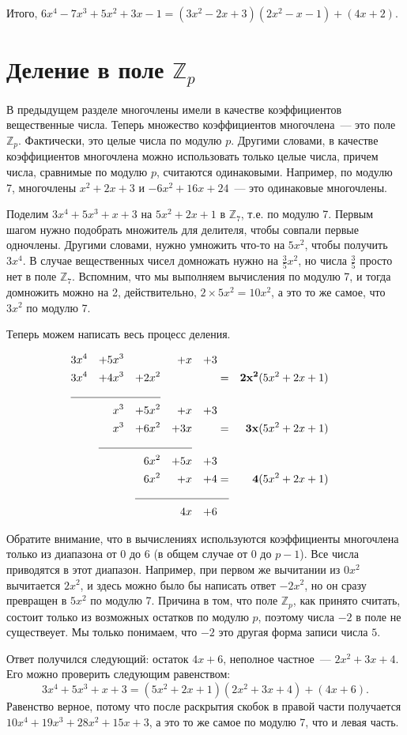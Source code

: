 \documentclass{article}
\begin{document}
Итого, $6x^4-7x^3+5x^2+3x-1=(3x^2 - 2x+3)(2x^2-x-1)+(4x+2)$.

\section{Деление в поле $\mathbb{Z}_p$}

В предыдущем разделе многочлены имели в качестве коэффициентов вещественные числа. Теперь множество коэффициентов многочлена~--- это поле $\mathbb{Z}_p$. Фактически, это целые числа по модулю $p$. Другими словами, в качестве коэффициентов многочлена можно использовать только целые числа, причем числа, сравнимые по модулю $p$, считаются одинаковыми. Например, по модулю 7, многочлены $x^2 + 2x + 3$ и $-6x^2+16x+24$~--- это одинаковые многочлены.

Поделим $3x^4+5x^3+x+3$ на $5x^2+2x+1$ в $\mathbb{Z}_7$, т.е. по модулю 7. Первым шагом нужно подобрать множитель для делителя, чтобы совпали первые одночлены. Другими словами, нужно умножить что-то на $5x^2$, чтобы получить $3x^4$. В случае вещественных чисел домножать нужно на $\frac35x^2$, но числа $\frac35$ просто нет в поле $\mathbb{Z}_7$. Вспомним, что мы выполняем вычисления по модулю 7, и тогда домножить можно на 2, действительно, $2\times 5x^2=10x^2$, а это то же самое, что $3x^2$ по модулю 7.

Теперь можем написать весь процесс деления.

\begin{alignat*}{11}
3&x^4&+5&x^3&&&+&x&+3\\
3&x^4&+4&x^3&+2&x^2&&&&=&\mathbf{2x^2}&(5x^2+2x+1)\\
\cline{1-6}
&&&x^3&+5&x^2&+&x&+3\\
&&&x^3&+6&x^2&+3&x&&=&\mathbf{3x}&(5x^2+2x+1)\\
\cline{3-8}
&&&&6&x^2&+5&x&+3\\
&&&&6&x^2&+&x&+4&=&\mathbf{4}&(5x^2+2x+1)\\
\cline{5-10}
&&&&&&4&x&+6\\
\end{alignat*}


Обратите внимание, что в вычислениях используются коэффициенты многочлена только из диапазона от 0 до 6 (в общем случае от 0 до $p-1$). Все числа приводятся в этот диапазон. Например, при первом же вычитании из $0x^2$ вычитается $2x^2$, и здесь можно было бы написать ответ $-2x^2$, но он сразу превращен в $5x^2$ по модулю 7. Причина в том, что поле $\mathbb{Z}_p$, как принято считать, состоит только из возможных остатков по модулю $p$, поэтому числа $-2$ в поле не существеует. Мы только понимаем, что $-2$ это другая форма записи числа $5$.

Ответ получился следующий: остаток $4x+6$, неполное частное~--- $2x^2+3x+4$. Его можно проверить следующим равенством:
$$3x^4+5x^3+x+3=(5x^2+2x+1)(2x^2+3x+4) + (4x+6).$$
Равенство верное, потому что после раскрытия скобок в правой части получается $10x^4+19x^3+28x^2+15x+3$, а это то же самое по модулю 7, что и левая часть.
\end{document}
